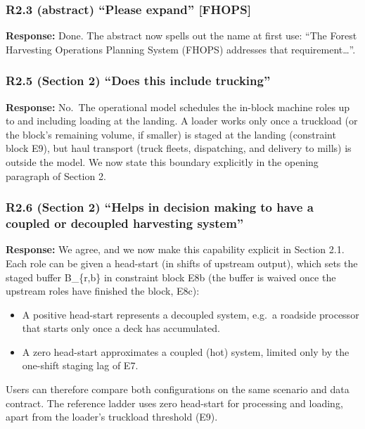 \subsubsection{R2.3 (abstract) ``Please expand''
{[}FHOPS{]}}\label{r2.3-abstract-please-expand-fhops}

\textbf{Response:} Done. The abstract now spells out the name at first
use: ``The Forest Harvesting Operations Planning System (FHOPS)
addresses that requirement\ldots{}''.

\subsubsection{R2.5 (Section 2) ``Does this include
trucking''}\label{r2.5-section-2-does-this-include-trucking}

\textbf{Response:} No.~The operational model schedules the in-block
machine roles up to and including loading at the landing. A loader works
only once a truckload (or the block's remaining volume, if smaller) is
staged at the landing (constraint block E9), but haul transport (truck
fleets, dispatching, and delivery to mills) is outside the model. We now
state this boundary explicitly in the opening paragraph of Section 2.

\subsubsection{R2.6 (Section 2) ``Helps in decision making to have a
coupled or decoupled harvesting
system''}\label{r2.6-section-2-helps-in-decision-making-to-have-a-coupled-or-decoupled-harvesting-system}

\textbf{Response:} We agree, and we now make this capability explicit in
Section 2.1. Each role can be given a head-start (in shifts of upstream
output), which sets the staged buffer B\_\{r,b\} in constraint block E8b
(the buffer is waived once the upstream roles have finished the block,
E8c):

\begin{itemize}
\tightlist
\item
  A positive head-start represents a decoupled system, e.g.~a roadside
  processor that starts only once a deck has accumulated.
\item
  A zero head-start approximates a coupled (hot) system, limited only by
  the one-shift staging lag of E7.
\end{itemize}

Users can therefore compare both configurations on the same scenario and
data contract. The reference ladder uses zero head-start for processing
and loading, apart from the loader's truckload threshold (E9).

